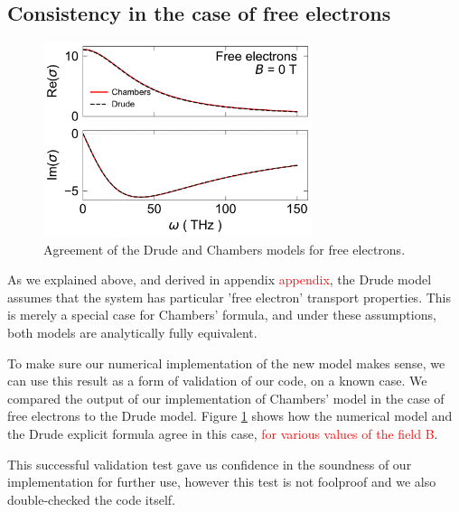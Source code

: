 \subsection{Consistency in the case of free electrons}
\begin{figure}
    \centering
    \includegraphics[width=0.7\textwidth]{figures/free_electrons}
    \caption{Agreement of the Drude and Chambers models for free electrons.}
    \label{fig:free_electrons}
\end{figure}

As we explained above, and derived in appendix \textcolor{red}{appendix}, 
the Drude model assumes that the system has particular 'free electron' transport properties. 
This is merely a special case for Chambers' formula, 
and under these assumptions, 
both models are analytically fully equivalent.

To make sure our numerical implementation of the new model makes sense, 
we can use this result as a form of validation of our code, on a known case. 
We compared the output of our implementation of Chambers' model in the case of free electrons to the Drude model. 
Figure \ref{fig:free_electrons} shows how the numerical model and the Drude explicit formula agree in this case, \textcolor{red}{for various values of the field B}.

This successful validation test gave us confidence in the soundness of our implementation for further use, 
however this test is not foolproof and we also double-checked the code itself.